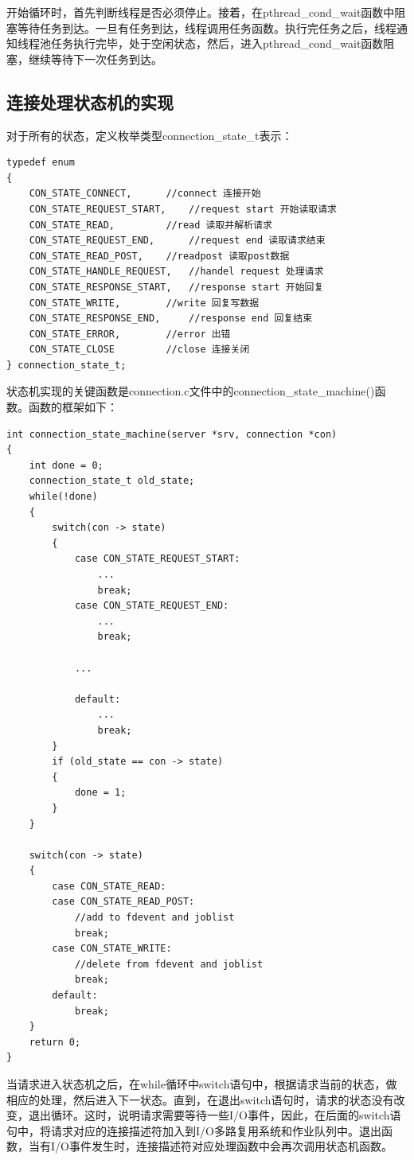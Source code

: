 \documentclass[12pt, twoside, a4paper, xetex]{report}
\begin{document}
	开始循环时，首先判断线程是否必须停止。接着，在pthread\_cond\_wait函数中阻塞等待任务到达。一旦有任务到达，线程调用任务函数。执行完任务之后，线程通知线程池任务执行完毕，处于空闲状态，然后，进入pthread\_cond\_wait函数阻塞，继续等待下一次任务到达。
	
\subsection{连接处理状态机的实现}
	对于所有的状态，定义枚举类型connection\_state\_t表示：
\begin{verbatim}	
typedef enum 
{
	CON_STATE_CONNECT, 		//connect 连接开始 
	CON_STATE_REQUEST_START, 	//request start 开始读取请求
	CON_STATE_READ, 		//read 读取并解析请求
	CON_STATE_REQUEST_END, 		//request end 读取请求结束
	CON_STATE_READ_POST, 	//readpost 读取post数据
	CON_STATE_HANDLE_REQUEST, 	//handel request 处理请求
	CON_STATE_RESPONSE_START, 	//response start 开始回复
	CON_STATE_WRITE, 		//write 回复写数据
	CON_STATE_RESPONSE_END, 	//response end 回复结束
	CON_STATE_ERROR, 		//error 出错
	CON_STATE_CLOSE 		//close 连接关闭
} connection_state_t;
\end{verbatim}
	
	状态机实现的关键函数是connection.c文件中的connection\_state\_machine()函数。函数的框架如下：

\begin{verbatim}	
int connection_state_machine(server *srv, connection *con)
{
	int done = 0;
	connection_state_t old_state;
	while(!done)
	{	
		switch(con -> state)
		{
			case CON_STATE_REQUEST_START:
				...
				break;
			case CON_STATE_REQUEST_END:
				...
				break;
			
			...
			
			default:
				...
				break;
		}
		if (old_state == con -> state)
		{
			done = 1;
		}
	}
	
	switch(con -> state)
	{
		case CON_STATE_READ:
		case CON_STATE_READ_POST:
			//add to fdevent and joblist
			break;
		case CON_STATE_WRITE:
			//delete from fdevent and joblist
			break;
		default:
			break;
	}
	return 0;
}
\end{verbatim}

	当请求进入状态机之后，在while循环中switch语句中，根据请求当前的状态，做相应的处理，然后进入下一状态。直到，在退出switch语句时，请求的状态没有改变，退出循环。这时，说明请求需要等待一些I/O事件，因此，在后面的switch语句中，将请求对应的连接描述符加入到I/O多路复用系统和作业队列中。退出函数，当有I/O事件发生时，连接描述符对应处理函数中会再次调用状态机函数。
	
\end{document}

